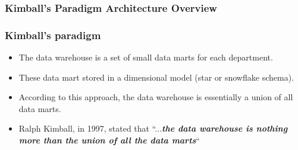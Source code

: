 \begin{frame}
	\frametitle{Kimball's Paradigm Architecture Overview}
	
\end{frame}

\begin{frame}
	\frametitle{Kimball's paradigm}
	\begin{itemize}[<+->]
		\item  The data warehouse is a set of small data marts for each department. 
		\item These data mart stored in a dimensional model (star or snowflake schema).
		\item According to this approach, the data warehouse is essentially a union of all data marts.
		\item Ralph Kimball, in 1997, stated that “...\textbf{\textit{the data warehouse is nothing more than the union of all the data marts}}“
	\end{itemize}
	
\end{frame}

